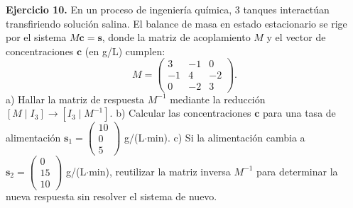 \documentclass[11pt,letterpaper]{article}
\theoremstyle{definition}
\theoremstyle{plain}
\newcommand{\vv}[1]{\mathbf{#1}}
\begin{document}
\vspace{0.3cm}
\textbf{Ejercicio 10.} En un proceso de ingeniería química, 3 tanques interactúan transfiriendo solución salina. El balance de masa en estado estacionario se rige por el sistema $M \vv{c} = \vv{s}$, donde la matriz de acoplamiento $M$ y el vector de concentraciones $\vv{c}$ (en g/L) cumplen:
\[
M = \begin{pmatrix} 3 & -1 & 0 \\ -1 & 4 & -2 \\ 0 & -2 & 3 \end{pmatrix}.
\]
a) Hallar la matriz de respuesta $M^{-1}$ mediante la reducción $[M \mid I_3] \to [I_3 \mid M^{-1}]$.
b) Calcular las concentraciones $\vv{c}$ para una tasa de alimentación $\vv{s}_1 = \begin{pmatrix} 10 \\ 0 \\ 5 \end{pmatrix}$ g/(L$\cdot$min).
c) Si la alimentación cambia a $\vv{s}_2 = \begin{pmatrix} 0 \\ 15 \\ 10 \end{pmatrix}$ g/(L$\cdot$min), reutilizar la matriz inversa $M^{-1}$ para determinar la nueva respuesta sin resolver el sistema de nuevo.
\end{document}
